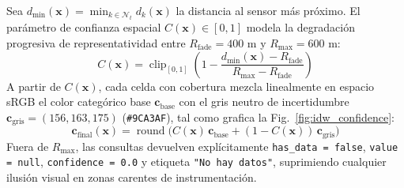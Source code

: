 \documentclass[conference]{IEEEtran}
\begin{document}
Sea $d_{\min}(\mathbf{x}) = \min_{k \in \mathcal{N}_t} d_k(\mathbf{x})$ la distancia al sensor más próximo. El parámetro de confianza espacial $C(\mathbf{x}) \in [0, 1]$ modela la degradación progresiva de representatividad entre $R_{\mathrm{fade}} = 400\text{ m}$ y $R_{\max} = 600\text{ m}$:
\begin{equation}
C(\mathbf{x}) = \operatorname{clip}_{[0,1]}\!\left(1 - \frac{d_{\min}(\mathbf{x}) - R_{\mathrm{fade}}}{R_{\max} - R_{\mathrm{fade}}}\right)
\label{eq:confidence}
\end{equation}
A partir de $C(\mathbf{x})$, cada celda con cobertura mezcla linealmente en espacio sRGB el color categórico base $\mathbf{c}_{\mathrm{base}}$ con el gris neutro de incertidumbre $\mathbf{c}_{\mathrm{gris}} = (156, 163, 175)$ (\texttt{\#9CA3AF}), tal como grafica la Fig.~\ref{fig:idw_confidence}:
\begin{equation}
\mathbf{c}_{\mathrm{final}}(\mathbf{x}) = \operatorname{round}\!\big(C(\mathbf{x})\,\mathbf{c}_{\mathrm{base}} + (1 - C(\mathbf{x}))\,\mathbf{c}_{\mathrm{gris}}\big)
\label{eq:rgb_blend}
\end{equation}
Fuera de $R_{\max}$, las consultas devuelven explícitamente \texttt{has\_data = false}, \texttt{value = null}, \texttt{confidence = 0.0} y etiqueta \texttt{"No hay datos"}, suprimiendo cualquier ilusión visual en zonas carentes de instrumentación.
\end{document}
